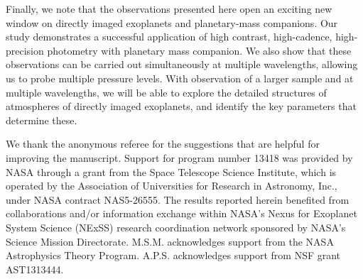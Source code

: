 \documentclass[apj]{emulateapj}
\begin{document}
Finally, we note that the observations presented here open an exciting
new window on directly imaged exoplanets and planetary-mass
companions. Our study demonstrates a successful application of
high contrast, high-cadence, high-precision photometry with planetary
mass companion. We also show that these observations can be carried
out simultaneously at multiple wavelengths, allowing us to probe
multiple pressure levels. With observation of a larger sample and at
multiple wavelengths, we will be able to explore the detailed
structures of atmospheres of directly imaged exoplanets, and identify
the key parameters that determine these.

\acknowledgments

We thank the anonymous referee for the suggestions that are helpful
for improving the manuscript. Support for program number 13418 was
provided by NASA through a grant from the Space Telescope Science
Institute, which is operated by the Association of Universities for
Research in Astronomy, Inc., under NASA contract NAS5-26555. The
results reported herein benefited from collaborations and/or
information exchange within NASA's Nexus for Exoplanet System Science
(NExSS) research coordination network sponsored by NASA's Science
Mission Directorate. M.S.M. acknowledges support from the NASA
Astrophysics Theory Program. A.P.S. acknowledges support from NSF
grant AST1313444.
\end{document}
